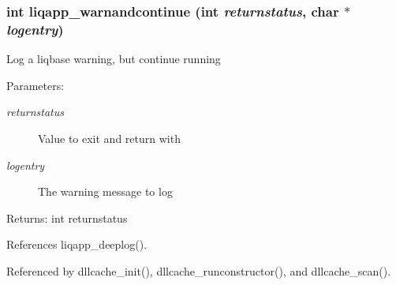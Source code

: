 \subsubsection[{liqapp\_\-warnandcontinue}]{\setlength{\rightskip}{0pt plus 5cm}int liqapp\_\-warnandcontinue (int {\em returnstatus}, \/  char $\ast$ {\em logentry})}\label{d7/dbc/liqapp_8c_8d6e3eca2ebe5fc70fc4536f535bad61}


Log a liqbase warning, but continue running \begin{Desc}
\item[Parameters:]
\begin{description}
\item[{\em returnstatus}]Value to exit and return with \item[{\em logentry}]The warning message to log \end{description}
\end{Desc}
\begin{Desc}
\item[Returns:]int returnstatus \end{Desc}


References liqapp\_\-deeplog().

Referenced by dllcache\_\-init(), dllcache\_\-runconstructor(), and dllcache\_\-scan().